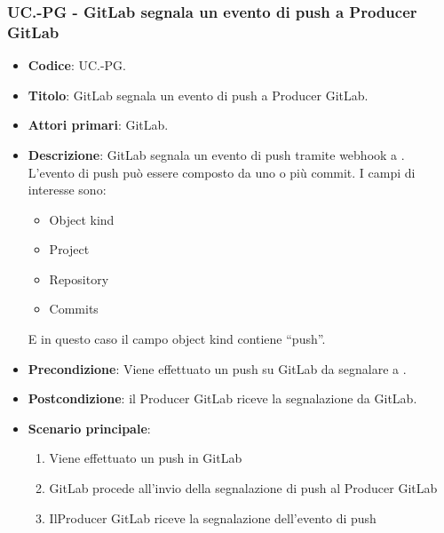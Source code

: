 \subsubsection{UC\theuccount.\thesubuccount-PG - GitLab segnala un evento di push a Producer GitLab}
\begin{itemize}
\item \textbf{Codice}: UC\theuccount.\thesubuccount-PG.
\item \textbf{Titolo}: GitLab segnala un evento di push a Producer GitLab.
\item \textbf{Attori primari}: GitLab.
\item \textbf{Descrizione}: GitLab segnala un evento di push tramite webhook a \progetto. L'evento di	push può essere composto da uno o più commit.
I campi di interesse sono:
\begin{itemize}
    \item Object kind
    \item Project
    \item Repository
    \item Commits
\end{itemize}
E in questo caso il campo object kind contiene ``push''.
\item \textbf{Precondizione}: Viene effettuato un push su GitLab da segnalare a \progetto.
\item \textbf{Postcondizione}: il Producer GitLab riceve la segnalazione da GitLab.
\item \textbf{Scenario principale}: 
\begin{enumerate}
    \item Viene effettuato un push in GitLab
    \item GitLab procede all'invio della segnalazione di push al Producer GitLab
    \item IlProducer GitLab riceve la segnalazione dell'evento di push
\end{enumerate}

\end{itemize}


